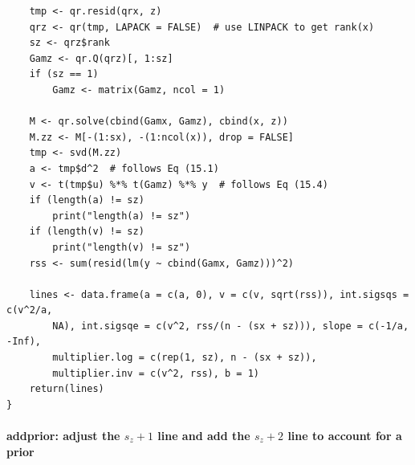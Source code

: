 \documentclass[ejs]{imsart}
\newcommand{\textcompute}{\textsf}
\begin{document}
\begin{verbatim}
    tmp <- qr.resid(qrx, z)
    qrz <- qr(tmp, LAPACK = FALSE)  # use LINPACK to get rank(x)
    sz <- qrz$rank
    Gamz <- qr.Q(qrz)[, 1:sz]
    if (sz == 1)
        Gamz <- matrix(Gamz, ncol = 1)

    M <- qr.solve(cbind(Gamx, Gamz), cbind(x, z))
    M.zz <- M[-(1:sx), -(1:ncol(x)), drop = FALSE]
    tmp <- svd(M.zz)
    a <- tmp$d^2  # follows Eq (15.1)
    v <- t(tmp$u) %*% t(Gamz) %*% y  # follows Eq (15.4)
    if (length(a) != sz)
        print("length(a) != sz")
    if (length(v) != sz)
        print("length(v) != sz")
    rss <- sum(resid(lm(y ~ cbind(Gamx, Gamz)))^2)

    lines <- data.frame(a = c(a, 0), v = c(v, sqrt(rss)), int.sigsqs = c(v^2/a,
        NA), int.sigsqe = c(v^2, rss/(n - (sx + sz))), slope = c(-1/a, -Inf),
        multiplier.log = c(rep(1, sz), n - (sx + sz)),
        multiplier.inv = c(v^2, rss), b = 1)
    return(lines)
}
\end{verbatim}

\paragraph{\textcompute{addprior}: adjust the $s_z+1$ line and add the $s_z+2$ line to account for a prior}
\end{document}
